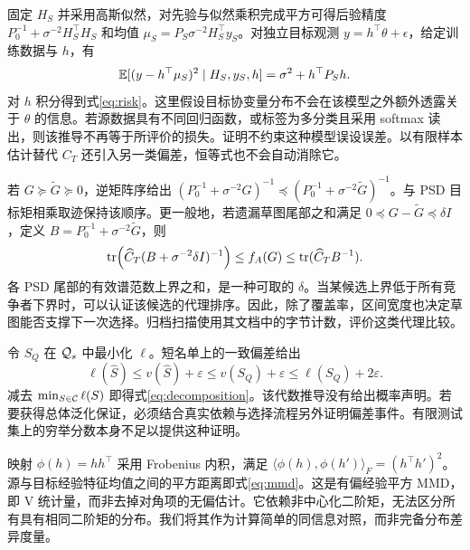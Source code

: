 固定 $H_S$ 并采用高斯似然，对先验与似然乘积完成平方可得后验精度 $P_0^{-1}+\sigma^{-2}H_S^\top H_S$ 和均值 $\mu_S=P_S\sigma^{-2}H_S^\top y_S$。对独立目标观测 $y=h^\top\theta+\epsilon$，给定训练数据与 $h$，有
\begin{equation}
 \mathbb{E}[(y-h^\top\mu_S)^2\mid H_S,y_S,h]=\sigma^2+h^\top P_Sh.
\end{equation}
对 $h$ 积分得到式\eqref{eq:risk}。这里假设目标协变量分布不会在该模型之外额外透露关于 $\theta$ 的信息。若源数据具有不同回归函数，或标签为多分类且采用 softmax 读出，则该推导不再等于所评价的损失。证明不约束这种模型误设误差。以有限样本估计替代 $C_T$ 还引入另一类偏差，恒等式也不会自动消除它。

若 $G\succeq\widetilde G\succeq0$，逆矩阵序给出 $(P_0^{-1}+\sigma^{-2}G)^{-1}\preceq(P_0^{-1}+\sigma^{-2}\widetilde G)^{-1}$。与 PSD 目标矩相乘取迹保持该顺序。更一般地，若遗漏草图尾部之和满足 $0\preceq G-\widetilde G\preceq\delta I$，定义 $B=P_0^{-1}+\sigma^{-2}\widetilde G$，则
\begin{equation}
 \operatorname{tr}\!\left(\widehat C_T(B+\sigma^{-2}\delta I)^{-1}\right)
 \leq f_A(G)\leq\operatorname{tr}(\widehat C_TB^{-1}).
 \label{eq:interval}
\end{equation}
各 PSD 尾部的有效谱范数上界之和，是一种可取的 $\delta$。当某候选上界低于所有竞争者下界时，可以认证该候选的代理排序。因此，除了覆盖率，区间宽度也决定草图能否支撑下一次选择。归档扫描使用其文档中的字节计数，评价这类代理比较。

令 $S_Q$ 在 $\mathcal{Q}_s$ 中最小化 $\ell$。短名单上的一致偏差给出
\begin{equation}
 \ell(\widehat S)\leq v(\widehat S)+\varepsilon
 \leq v(S_Q)+\varepsilon\leq\ell(S_Q)+2\varepsilon.
\end{equation}
减去 $\min_{S\in\mathcal{C}}\ell(S)$ 即得式\eqref{eq:decomposition}。该代数推导没有给出概率声明。若要获得总体泛化保证，必须结合真实依赖与选择流程另外证明偏差事件。有限测试集上的穷举分数本身不足以提供这种证明。

映射 $\phi(h)=hh^\top$ 采用 Frobenius 内积，满足 $\langle\phi(h),\phi(h')\rangle_F=(h^\top h')^2$。源与目标经验特征均值之间的平方距离即式\eqref{eq:mmd}。这是有偏经验平方 MMD，即 V 统计量，而非去掉对角项的无偏估计。它依赖非中心化二阶矩，无法区分所有具有相同二阶矩的分布。我们将其作为计算简单的同信息对照，而非完备分布差异度量。

